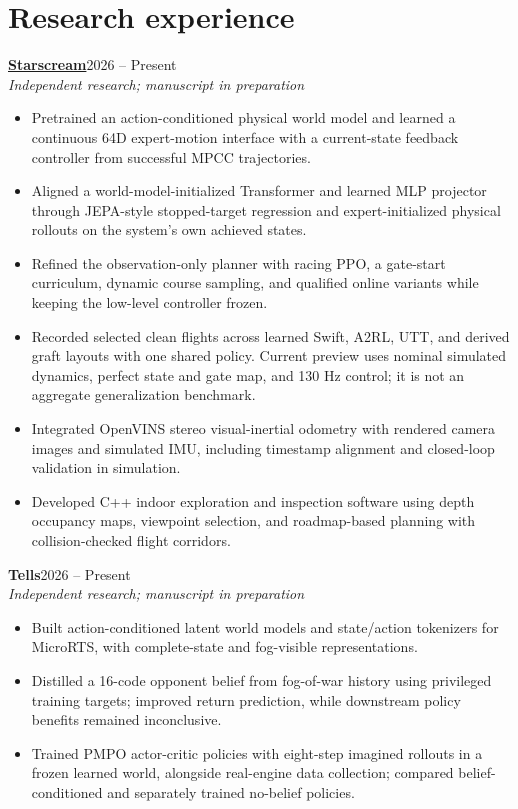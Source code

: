 \documentclass[10pt,letterpaper]{article}
\newcommand{\entry}[3]{\textbf{#1}\hfill #2\\{\itshape #3}\par}
\begin{document}
\section{Research experience}
\entry{\href{https://andrew-olvera-research.github.io/site/starscream/}{Starscream}}{2026 -- Present}{Independent research; manuscript in preparation}
\begin{itemize}
\item Pretrained an action-conditioned physical world model and learned a continuous 64D expert-motion interface with a current-state feedback controller from successful MPCC trajectories.
\item Aligned a world-model-initialized Transformer and learned MLP projector through JEPA-style stopped-target regression and expert-initialized physical rollouts on the system's own achieved states.
\item Refined the observation-only planner with racing PPO, a gate-start curriculum, dynamic course sampling, and qualified online variants while keeping the low-level controller frozen.
\item Recorded selected clean flights across learned Swift, A2RL, UTT, and derived graft layouts with one shared policy. Current preview uses nominal simulated dynamics, perfect state and gate map, and 130 Hz control; it is not an aggregate generalization benchmark.
\item Integrated OpenVINS stereo visual-inertial odometry with rendered camera images and simulated IMU, including timestamp alignment and closed-loop validation in simulation.
\item Developed C++ indoor exploration and inspection software using depth occupancy maps, viewpoint selection, and roadmap-based planning with collision-checked flight corridors.
\end{itemize}
\entry{Tells}{2026 -- Present}{Independent research; manuscript in preparation}
\begin{itemize}
\item Built action-conditioned latent world models and state/action tokenizers for MicroRTS, with complete-state and fog-visible representations.
\item Distilled a 16-code opponent belief from fog-of-war history using privileged training targets; improved return prediction, while downstream policy benefits remained inconclusive.
\item Trained PMPO actor-critic policies with eight-step imagined rollouts in a frozen learned world, alongside real-engine data collection; compared belief-conditioned and separately trained no-belief policies.
\end{itemize}
\end{document}
